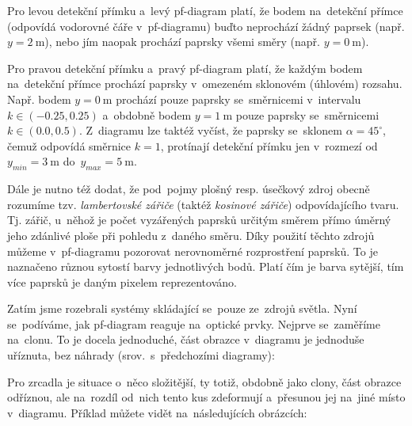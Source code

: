 
Pro levou detekční přímku a~levý pf-diagram platí, že bodem na~detekční přímce (odpovídá vodorovné čáře v~pf-diagramu) buďto neprochází žádný paprsek (např. $y = 2\ \mathrm{m}$), nebo jím naopak prochází paprsky všemi směry (např. $y = 0\ \mathrm{m}$).

Pro pravou detekční přímku a~pravý pf-diagram platí, že každým bodem na~detekční přímce prochází paprsky v~omezeném sklonovém (úhlovém) rozsahu. Např. bodem $y = 0\ \mathrm{m}$ prochází pouze paprsky se~směrnicemi v~intervalu $k \in (-0.25, 0.25)$ a~obdobně bodem $y = 1\ \mathrm{m}$ pouze paprsky se~směrnicemi $k \in (0.0, 0.5)$. Z~diagramu lze taktéž vyčíst, že paprsky se~sklonem $\alpha = 45^{\circ}$, čemuž odpovídá směrnice $k = 1$, protínají detekční přímku jen v~rozmezí od~$y_{min} = 3\ \mathrm{m}$ do~$y_{max} = 5\ \mathrm{m}$.

Dále je nutno též dodat, že pod~pojmy plošný resp. úsečkový zdroj obecně rozumíme tzv. \emph{lambertovské zářiče} (taktéž \emph{kosinové zářiče}) odpovídajícího tvaru. \parencite{fotometrie} Tj. zářič, u~něhož je počet vyzářených paprsků určitým směrem přímo úměrný jeho zdánlivé ploše při pohledu z~daného směru. Díky použití těchto zdrojů můžeme v~pf-diagramu pozorovat nerovnoměrné rozprostření paprsků. To je naznačeno různou sytostí barvy jednotlivých bodů. Platí čím je barva sytější, tím více paprsků je daným pixelem reprezentováno.

Zatím jsme rozebrali systémy skládající se~pouze ze~zdrojů světla. Nyní se~podíváme, jak pf-diagram reaguje na~optické prvky. Nejprve se~zaměříme na~clonu. To je docela jednoduché, část obrazce v~diagramu je jednoduše uříznuta, bez náhrady (srov.~s~předchozími diagramy):


\beautypage

Pro zrcadla je situace o~něco složitější, ty totiž, obdobně jako clony, část obrazce odříznou, ale na~rozdíl od~nich tento kus zdeformují a~přesunou jej na~jiné místo v~diagramu. Příklad můžete vidět na~následujících obrázcích:

